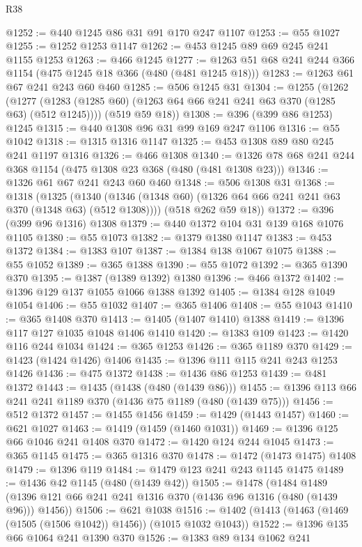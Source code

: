 \begin{lexlean}{R38}
\begin{coremodule}
@1252 := @440 @1245 @86 @31 @91 @170 @247 @1107
@1253 := @55 @1027
@1255 := @1252 @1253 @1147
@1262 := @453 @1245 @89 @69 @245 @241 @1155 @1253
@1263 := @466 @1245
@1277 := @1263 @51 @68 @241 @244 @366 @1154 (@475 @1245 @18 @366 (@480 (@481 @1245 @18)))
@1283 := @1263 @61 @67 @241 @243 @60 @460
@1285 := @506 @1245 @31
@1304 := @1255
    (@1262
      (@1277 (@1283 (@1285 @60) (@1263 @64 @66 @241 @241 @63 @370 (@1285 @63) (@512 @1245))))
      (@519 @59 @18))
@1308 := @396 (@399 @86 @1253) @1245
@1315 := @440 @1308 @96 @31 @99 @169 @247 @1106
@1316 := @55 @1042
@1318 := @1315 @1316 @1147
@1325 := @453 @1308 @89 @80 @245 @241 @1197 @1316
@1326 := @466 @1308
@1340 := @1326 @78 @68 @241 @244 @368 @1154 (@475 @1308 @23 @368 (@480 (@481 @1308 @23)))
@1346 := @1326 @61 @67 @241 @243 @60 @460
@1348 := @506 @1308 @31
@1368 := @1318
    (@1325
      (@1340 (@1346 (@1348 @60) (@1326 @64 @66 @241 @241 @63 @370 (@1348 @63) (@512 @1308))))
      (@518 @262 @59 @18))
@1372 := @396 (@399 @96 @1316) @1308
@1379 := @440 @1372 @104 @31 @139 @168 @1076 @1105
@1380 := @55 @1073
@1382 := @1379 @1380 @1147
@1383 := @453 @1372
@1384 := @1383 @107
@1387 := @1384 @138 @1067 @1075
@1388 := @55 @1052
@1389 := @365 @1388
@1390 := @55 @1072
@1392 := @365 @1390 @370
@1395 := @1387 (@1389 @1392) @1380
@1396 := @466 @1372
@1402 := @1396 @129 @137 @1055 @1066 @1388 @1392
@1405 := @1384 @128 @1049 @1054
@1406 := @55 @1032
@1407 := @365 @1406
@1408 := @55 @1043
@1410 := @365 @1408 @370
@1413 := @1405 (@1407 @1410) @1388
@1419 := @1396 @117 @127 @1035 @1048 @1406 @1410
@1420 := @1383 @109
@1423 := @1420 @116 @244 @1034
@1424 := @365 @1253
@1426 := @365 @1189 @370
@1429 := @1423 (@1424 @1426) @1406
@1435 := @1396 @111 @115 @241 @243 @1253 @1426
@1436 := @475 @1372
@1438 := @1436 @86 @1253
@1439 := @481 @1372
@1443 := @1435 (@1438 (@480 (@1439 @86)))
@1455 := @1396 @113 @66 @241 @241 @1189 @370 (@1436 @75 @1189 (@480 (@1439 @75)))
@1456 := @512 @1372
@1457 := @1455 @1456
@1459 := @1429 (@1443 @1457)
@1460 := @621 @1027
@1463 := @1419 (@1459 (@1460 @1031))
@1469 := @1396 @125 @66 @1046 @241 @1408 @370
@1472 := @1420 @124 @244 @1045
@1473 := @365 @1145
@1475 := @365 @1316 @370
@1478 := @1472 (@1473 @1475) @1408
@1479 := @1396 @119
@1484 := @1479 @123 @241 @243 @1145 @1475
@1489 := @1436 @42 @1145 (@480 (@1439 @42))
@1505 := @1478
    (@1484 @1489 (@1396 @121 @66 @241 @241 @1316 @370 (@1436 @96 @1316 (@480 (@1439 @96))) @1456))
@1506 := @621 @1038
@1516 := @1402 (@1413 (@1463 (@1469 (@1505 (@1506 @1042)) @1456)) (@1015 @1032 @1043))
@1522 := @1396 @135 @66 @1064 @241 @1390 @370
@1526 := @1383 @89 @134 @1062 @241

\end{coremodule}
\end{lexlean}
